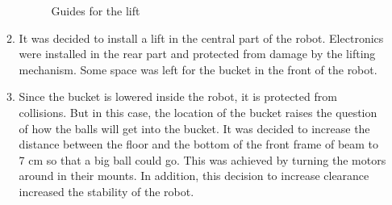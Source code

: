 \begin{enumerate}
\begin{enumerate}
\begin{figure}[H]
\begin{minipage}[h]{0.31\linewidth}
			\end{minipage}
			\caption{Guides for the lift}
		\end{figure}
		
		\item It was decided to install a lift in the central part of the robot. Electronics were installed in the rear part and protected from damage by the lifting mechanism. Some space was left for the bucket in the front of the robot. 
		
		\item Since the bucket is lowered inside the robot, it is protected from collisions. But in this case, the location of the bucket raises the question of how the balls will get into the bucket. It was decided to increase the distance between the floor and the bottom of the front frame of beam to 7 cm so that a big ball could go. This was achieved by turning the motors around in their mounts. In addition, this decision to increase clearance increased the stability of the robot.
		

\end{enumerate}
\end{enumerate}
